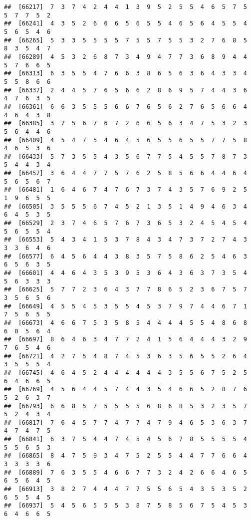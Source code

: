 \documentclass[
]{book}
\begin{document}
\begin{verbatim}
##  [66217]  7  3  7  4  2  4  4  1  3  9  5  2  5  5  4  6  5  7  5  5  7  7  5  2
##  [66241]  4  3  5  2  6  6  6  5  6  5  5  4  6  5  6  4  5  5  4  5  6  5  4  6
##  [66265]  5  3  3  5  5  5  5  7  5  5  7  5  5  3  2  7  6  8  5  8  3  5  4  7
##  [66289]  4  5  3  2  6  8  7  3  4  9  4  7  7  3  6  8  9  4  4  5  7  6  6  5
##  [66313]  6  3  5  5  4  7  6  6  3  8  6  5  6  3  6  4  3  3  4  5  5  8  6  6
##  [66337]  2  4  4  5  7  6  5  6  6  2  8  6  9  5  7  4  4  3  6  4  7  6  3  5
##  [66361]  6  6  3  5  5  5  6  6  7  6  5  6  2  7  6  5  6  6  4  4  6  4  3  8
##  [66385]  3  7  5  6  7  6  7  2  6  6  5  6  3  4  7  5  3  2  3  5  6  4  4  6
##  [66409]  4  5  4  7  5  4  6  4  5  6  5  5  6  5  5  7  7  5  8  4  6  5  3  6
##  [66433]  5  7  3  5  5  4  3  5  6  7  7  5  4  5  5  7  8  7  3  5  4  4  3  4
##  [66457]  3  6  4  4  7  7  5  7  6  2  5  8  5  6  6  4  4  6  4  5  6  5  6  7
##  [66481]  1  6  4  6  7  4  7  6  7  3  7  4  3  5  7  6  9  2  5  1  9  6  5  5
##  [66505]  3  5  5  5  6  7  4  5  2  1  3  5  1  4  9  4  6  3  4  6  4  5  3  5
##  [66529]  2  3  7  4  6  5  7  6  7  3  6  5  3  2  4  5  4  5  4  5  6  5  5  4
##  [66553]  5  4  3  4  1  5  3  7  8  4  3  4  7  3  7  2  7  4  3  3  3  6  4  6
##  [66577]  6  4  5  6  4  4  3  8  3  5  7  5  8  6  2  5  4  6  3  6  5  6  3  5
##  [66601]  4  4  6  4  3  5  3  9  5  3  6  4  3  6  3  7  3  5  4  5  6  3  3  3
##  [66625]  5  7  7  2  3  6  4  3  7  7  8  6  5  2  3  6  7  5  7  3  5  6  5  6
##  [66649]  4  5  5  4  5  3  5  5  4  5  3  7  9  7  4  4  6  7  1  7  5  6  5  5
##  [66673]  4  6  6  7  5  3  5  8  5  4  4  4  4  5  5  4  8  6  8  6  0  5  6  4
##  [66697]  8  6  4  6  3  4  7  7  2  4  1  5  6  4  4  4  3  2  9  7  6  5  4  6
##  [66721]  4  2  7  5  4  8  7  4  5  3  6  3  5  6  5  5  2  6  4  3  5  5  5  4
##  [66745]  4  6  4  5  2  4  4  4  4  4  4  3  5  5  6  7  5  2  5  6  4  6  6  5
##  [66769]  4  5  6  4  4  5  7  4  4  3  5  4  6  6  5  2  8  7  6  5  2  6  3  7
##  [66793]  6  6  8  5  7  5  5  5  5  6  8  6  8  5  3  2  3  5  7  5  2  4  3  4
##  [66817]  7  6  4  5  7  7  4  7  7  4  7  9  4  6  5  3  6  3  7  4  7  4  7  5
##  [66841]  6  3  7  5  4  4  7  4  5  4  5  6  7  8  5  5  5  5  4  5  5  6  5  3
##  [66865]  8  4  7  5  9  3  4  7  5  2  5  5  4  4  7  7  6  6  4  3  3  3  3  6
##  [66889]  7  6  3  5  5  4  6  6  7  7  3  2  4  2  6  6  4  6  5  6  5  6  4  5
##  [66913]  3  8  2  7  4  4  4  7  7  5  5  6  5  4  3  5  3  5  2  6  5  5  4  5
##  [66937]  5  4  5  6  5  5  5  3  8  7  5  8  5  6  7  5  4  5  3  6  4  6  6  5

\end{verbatim}
\end{document}
